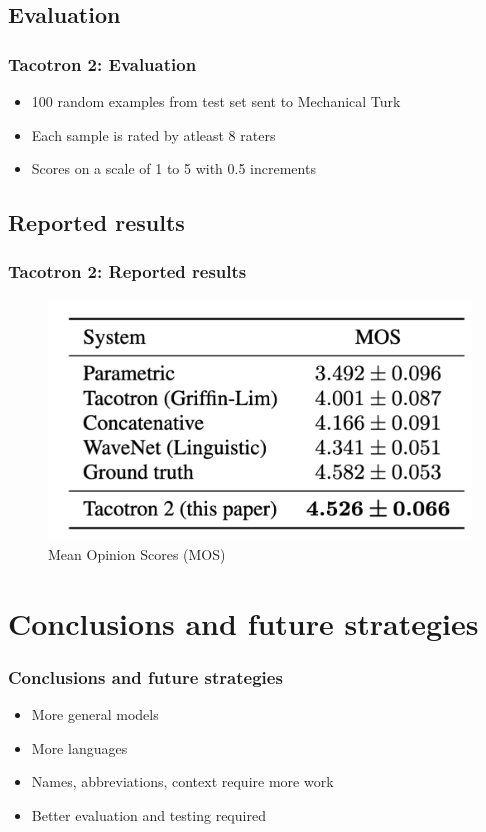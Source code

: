 \documentclass{beamer}
\begin{document}
  \subsection{Evaluation}
  \begin{frame}
    \frametitle{Tacotron 2: Evaluation}
    \begin{itemize}
      \item 100 random examples from test set sent to Mechanical Turk
      \item Each sample is rated by atleast 8 raters
      \item Scores on a scale of 1 to 5 with 0.5 increments
    \end{itemize}
  \end{frame}

  \subsection{Reported results}
  \begin{frame}
    \frametitle{Tacotron 2: Reported results}
    \begin{figure}
      \includegraphics[scale=0.3]{images/tacotron_results.png}
      \caption{Mean Opinion Scores (MOS)}
    \end{figure}
  \end{frame}

  \section{Conclusions and future strategies}
  \begin{frame}
    \frametitle{Conclusions and future strategies}
    \begin{itemize}
      \item More general models
      \item More languages
      \item Names, abbreviations, context require more work
      \item Better evaluation and testing required
    \end{itemize}
  \end{frame}
\end{document}
